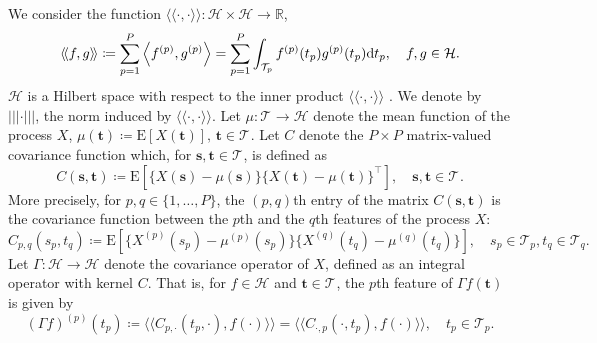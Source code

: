 \documentclass[times,sort&compress,3p]{elsarticle}
\theoremstyle{plain}%
\theoremstyle{definition}
\newcommand{\EE}{\mathrm{E}} %
\newcommand{\RR}{\mathbb{R}} %
\newcommand{\dd}{{\rm d}}
\newcommand{\TT}[1]{\mathcal{T}_{#1}} %
\newcommand{\HH}{\mathcal{H}} %
\newcommand{\pointt}{\mathbf{t}} %
\newcommand{\points}{\mathbf{s}} %
\newcommand{\inLp}[2]{\left\langle#1, #2\right\rangle} %
\newcommand{\inH}[2]{\langle\!\langle#1, #2\rangle\!\rangle}
\newcommand{\normH}[1]{\left|\left|\left|#1\right|\right|\right|}
\newcommand{\Xp}[1]{X^{(#1)}} %
\newcommand{\mup}[1]{\mu^{(#1)}} %
\newcommand{\fp}{f^{(p)}}
\newcommand{\gp}{g^{(p)}}
\begin{document}
We consider the function $\inH{\cdot}{\cdot} : \HH \times \HH \rightarrow \RR$,
\begin{equation}\label{eq:innerprodH}
    \inH{f}{g} \coloneqq \sum_{p=1}^{P} \inLp{\fp}{\gp} = \sum_{p=1}^{P}\int_{\TT{p}} \fp(t_p)\gp(t_p) \dd t_p, \quad f, g \in \HH.
\end{equation}
$\HH$ is a Hilbert space with respect to the inner product $\inH{\cdot}{\cdot}$ \cite{happMultivariateFunctionalPrincipal2018a}. We denote by $\normH{\cdot}$, the norm induced by $\inH{\cdot}{\cdot}$. Let $\mu : \TT{} \rightarrow \HH$ denote the mean function of the process $X$, $\mu(\pointt) \coloneqq \EE[X(\pointt)],\,\pointt \in \TT{}$. Let $C$ denote the $P \times P$ matrix-valued covariance function which, for $\points, \pointt \in \TT{}$, is defined as
\begin{equation}\label{eq:covariance_function}
    C(\points, \pointt) \coloneqq \EE\left[\{X(\points) - \mu(\points)\}\{X(\pointt) - \mu(\pointt)\}^{\top}\right], \quad \points, \pointt \in \TT{}.
\end{equation}
More precisely, for $p, q \in \{1, \dots, P\}$, the $(p, q)$th entry of the matrix $C(\points, \pointt)$ is the covariance function between the $p$th and the $q$th features of the process $X$:
\begin{equation}\label{eq:covariance_function_components}
    C_{p, q}(s_p, t_q) \coloneqq \EE\left[\{\Xp{p}(s_p) - \mup{p}(s_p)\}\{\Xp{q}(t_q) - \mup{q}(t_q)\}\right], \quad s_p \in \TT{p}, t_q \in \TT{q}.
\end{equation}
Let $\Gamma : \HH \rightarrow \HH$ denote the covariance operator of $X$, defined as an integral operator with kernel $C$. That is, for $f \in \HH$ and $\pointt \in \TT{}$, the $p$th feature of $\Gamma f(\pointt)$ is given by
\begin{equation}\label{eq:covariance_operator_components}
    (\Gamma f)^{(p)}(t_p) \coloneqq \inH{C_{p, \cdot}(t_p, \cdot)}{f(\cdot)} = \inH{C_{\cdot, p}(\cdot, t_p)}{f(\cdot)}, \quad t_p \in \TT{p}.
\end{equation}
\end{document}

